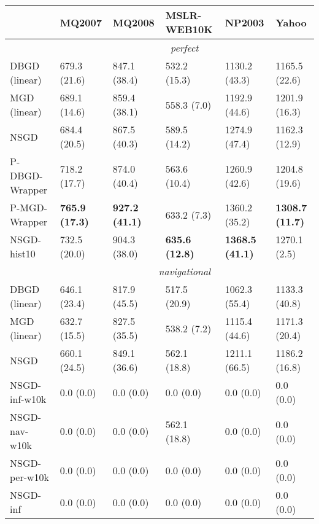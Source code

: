 \begin{tabular*}{\textwidth}{@{\extracolsep{\fill} } l  l l l l l  }
\toprule
 & { \small \textbf{MQ2007}}  & { \small \textbf{MQ2008}}  & { \small \textbf{MSLR-WEB10K}}  & { \small \textbf{NP2003}}  & { \small \textbf{Yahoo}} \\
\midrule
& \multicolumn{5}{|c|}{\textit{perfect}} \\
\midrule
DBGD (linear) & 679.3 {\tiny (21.6)} & 847.1 {\tiny (38.4)} & 532.2 {\tiny (15.3)} & 1130.2 {\tiny (43.3)} & 1165.5 {\tiny (22.6)} \\
MGD (linear) & 689.1 {\tiny (14.6)} & 859.4 {\tiny (38.1)} & 558.3 {\tiny (7.0)} & 1192.9 {\tiny (44.6)} & 1201.9 {\tiny (16.3)} \\
NSGD & 684.4 {\tiny (20.5)} & 867.5 {\tiny (40.3)} & 589.5 {\tiny (14.2)} & 1274.9 {\tiny (47.4)} & 1162.3 {\tiny (12.9)} \\
P-DBGD-Wrapper & 718.2 {\tiny (17.7)} & 874.0 {\tiny (40.4)} & 563.6 {\tiny (10.4)} & 1260.9 {\tiny (42.6)} & 1204.8 {\tiny (19.6)} \\
P-MGD-Wrapper & \bf 765.9 {\tiny (17.3)} & \bf 927.2 {\tiny (41.1)} & 633.2 {\tiny (7.3)} & 1360.2 {\tiny (35.2)} & \bf 1308.7 {\tiny (11.7)} \\
NSGD-hist10 & 732.5 {\tiny (20.0)} & 904.3 {\tiny (38.0)} & \bf 635.6 {\tiny (12.8)} & \bf 1368.5 {\tiny (41.1)} & 1270.1 {\tiny (2.5)} \\
\midrule
& \multicolumn{5}{|c|}{\textit{navigational}} \\
\midrule
DBGD (linear) & 646.1 {\tiny (23.4)} & 817.9 {\tiny (45.5)} & 517.5 {\tiny (20.9)} & 1062.3 {\tiny (55.4)} & 1133.3 {\tiny (40.8)} \\
MGD (linear) & 632.7 {\tiny (15.5)} & 827.5 {\tiny (35.5)} & 538.2 {\tiny (7.2)} & 1115.4 {\tiny (44.6)} & 1171.3 {\tiny (20.4)} \\
NSGD & 660.1 {\tiny (24.5)} & 849.1 {\tiny (36.6)} & 562.1 {\tiny (18.8)} & 1211.1 {\tiny (66.5)} & 1186.2 {\tiny (16.8)} \\
NSGD-inf-w10k & 0.0 {\tiny (0.0)} & 0.0 {\tiny (0.0)} & 0.0 {\tiny (0.0)} & 0.0 {\tiny (0.0)} & 0.0 {\tiny (0.0)} \\
NSGD-nav-w10k & 0.0 {\tiny (0.0)} & 0.0 {\tiny (0.0)} & 562.1 {\tiny (18.8)} & 0.0 {\tiny (0.0)} & 0.0 {\tiny (0.0)} \\
NSGD-per-w10k & 0.0 {\tiny (0.0)} & 0.0 {\tiny (0.0)} & 0.0 {\tiny (0.0)} & 0.0 {\tiny (0.0)} & 0.0 {\tiny (0.0)} \\
NSGD-inf & 0.0 {\tiny (0.0)} & 0.0 {\tiny (0.0)} & 0.0 {\tiny (0.0)} & 0.0 {\tiny (0.0)} & 0.0 {\tiny (0.0)} \\

\end{tabular*}
